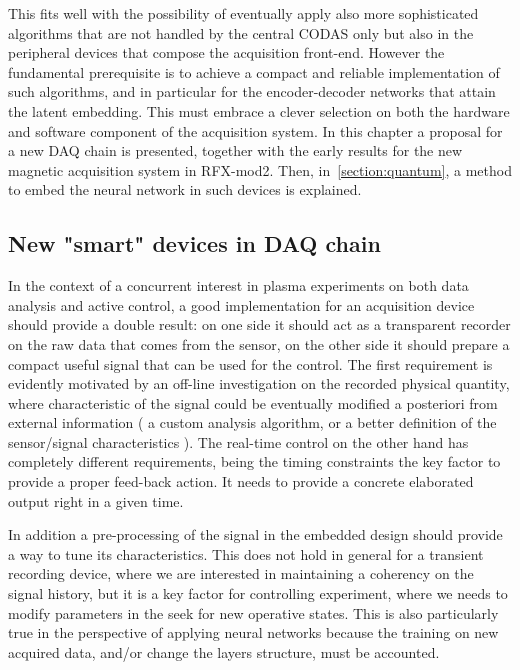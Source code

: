 This fits well with the possibility of eventually apply also more sophisticated algorithms that are not handled by the central CODAS only but also in the peripheral devices that compose the acquisition front-end. 
However the fundamental prerequisite is to achieve a compact and reliable implementation of such algorithms, and in particular for the encoder-decoder networks that attain the latent embedding. This must embrace a clever selection on both the hardware and software component of the acquisition system. In this chapter a proposal for a new DAQ chain is presented, together with the early results for the new magnetic acquisition system in RFX-mod2. Then, in~\cref{section:quantum}, a method to embed the neural network in such devices is explained.


\subsection{New "smart" devices in DAQ chain}
\label{section:daq-chain}

In the context of a concurrent interest in plasma experiments on both data analysis and active control, a good implementation for an acquisition device should provide a double result: on one side it should act as a transparent recorder on the raw data that comes from the sensor, on the other side it should prepare a compact useful signal that can be used for the control.
The first requirement is evidently motivated by an off-line investigation on the recorded physical quantity, where characteristic of the signal could be eventually modified a posteriori from external information ( a custom analysis algorithm, or a better definition of the sensor/signal characteristics ). 
The real-time control on the other hand has completely different requirements, being the timing constraints the key factor to provide a proper feed-back action. It needs to provide a concrete elaborated output right in a given time.

In addition a pre-processing of the signal in the embedded design should provide a way to tune its characteristics. This does not hold in general for a transient recording device, where we are interested in maintaining a coherency on the signal history, but it is a key factor for controlling experiment, where we needs to modify parameters in the seek for new operative states. This is also particularly true in the perspective of applying neural networks because the training on new acquired data, and/or change the layers structure, must be accounted.

